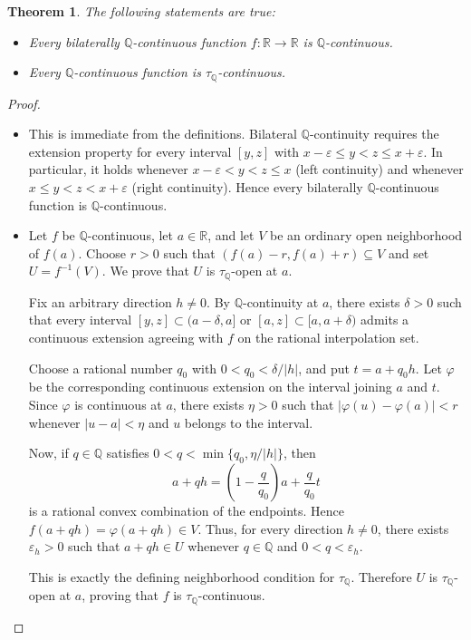 \documentclass[11pt]{amsart} %
\newtheorem{theorem}{Theorem}[section]
\theoremstyle{definition}
\newcommand{\R}{\mathbb{R}}
\newcommand{\Q}{\mathbb{Q}}
\begin{document}
\begin{theorem} The following statements are true: 
\begin{itemize} 
\item[(a). ] Every bilaterally $\Q$-continuous function $f:\R\rightarrow \R$ is $\Q$-continuous. 
\item[(b). ] Every $\Q$-continuous function is $\tau_{\Q}$-continuous. 
\end{itemize} 
\label{thm:inclusions}
\end{theorem} 
\begin{proof}
\begin{itemize} 
\item[(a). ] This is immediate from the definitions. Bilateral $\Q$-continuity requires the extension property for every interval $[y,z]$ with $x-\varepsilon\le y<z\le x+\varepsilon$. In particular, it holds whenever $x-\varepsilon<y<z\le x$ (left continuity) and whenever $x\le y<z<x+\varepsilon$ (right continuity). Hence every bilaterally $\Q$-continuous function is $\Q$-continuous.

\item[(b). ] Let $f$ be $\Q$-continuous, let $a\in\mathbb R$, and let $V$ be an ordinary open neighborhood of $f(a)$. Choose $r > 0$ such that $(f(a)-r,f(a)+r)\subseteq V$ and set $U=f^{-1}(V)$. We prove that $U$ is $\tau_{\Q}$-open at $a$.

Fix an arbitrary direction $h\neq 0$. By $\Q$-continuity at $a$, there exists $\delta>0$ such that every interval $[y,z]\subset(a-\delta,a]$ or $[a,z]\subset[a,a+\delta)$ admits a continuous extension agreeing with $f$ on the rational interpolation set.

Choose a rational number $q_0$ with $0<q_0<\delta/|h|$, and put $t=a+q_0h$. Let $\varphi$ be the corresponding continuous extension on the interval joining $a$ and $t$. Since $\varphi$ is continuous at $a$, there exists $\eta>0$ such that $|\varphi(u)-\varphi(a)|<r$ whenever $|u-a|<\eta$ and $u$ belongs to the interval.

Now, if $q\in\mathbb Q$ satisfies $0<q<\min\{q_0,\eta/|h|\}$, then 
\begin{equation} 
a+qh=(1-\frac{q}{q_0})a+\frac{q}{q_0}t
\end{equation} is a rational convex combination of the endpoints. Hence $f(a+qh)=\varphi(a+qh)\in V$.
Thus, for every direction $h\neq0$, there exists $\varepsilon_h>0$ such that
$a+qh\in U$ whenever $q\in\mathbb Q$ and $0<q<\varepsilon_h$.

This is exactly the defining neighborhood condition for $\tau_{\Q}$. Therefore $U$ is $\tau_{\Q}$-open at $a$, proving that $f$ is $\tau_{\Q}$-continuous.
\end{itemize} 
\end{proof} 
\end{document}
